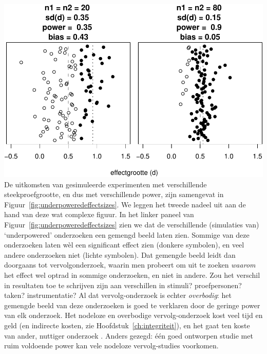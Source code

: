 \documentclass[
]{book}
\begin{document}
\includegraphics{KMS-NL_files/figure-latex/underpoweredeffectsizes-1.pdf}
De uitkomsten van gesimuleerde experimenten met verschillende
steekproefgrootte, en dus met verschillende power, zijn samengevat in
Figuur~\ref{fig:underpoweredeffectsizes}. We leggen het tweede nadeel uit aan de hand van deze wat complexe figuur. In het linker paneel van
Figuur~\ref{fig:underpoweredeffectsizes} zien we dat de verschillende
(simulaties van) `underpowered' onderzoeken een gemengd beeld laten
zien. Sommige van deze onderzoeken laten wèl een significant effect zien
(donkere symbolen), en veel andere onderzoeken niet (lichte symbolen).
Dat gemengde beeld leidt dan doorgaans tot vervolgonderzoek, waarin men
probeert om uit te zoeken \emph{waarom} het effect wel optrad in sommige
onderzoeken, en niet in andere. Zou het verschil in resultaten toe te
schrijven zijn aan verschillen in stimuli? proefpersonen? taken?
instrumentatie? Al dat vervolg-onderzoek is echter \emph{overbodig}: het
gemengde beeld van deze onderzoeken is goed te verklaren door de geringe
power van elk onderzoek. Het nodeloze en overbodige vervolg-onderzoek
kost veel tijd en geld (en indirecte kosten, zie
Hoofdstuk~\ref{ch:integriteit}), en het gaat ten koste van ander, nuttiger
onderzoek \citep[p.118]{Schm96}. Anders gezegd: één goed ontworpen studie met
ruim voldoende power kan vele nodeloze vervolg-studies voorkomen.
\end{document}
